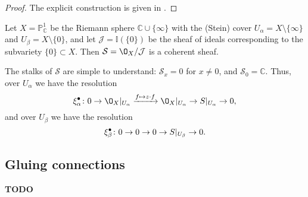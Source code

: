         \begin{proof}
            The explicit construction is given in \cite[§1]{Green:1980wpa}.
        \end{proof}

        \begin{example}
            Let $X=\mathbb{P}^1_\mathbb{C}$ be the Riemann sphere $\mathbb{C}\cup\{\infty\}$ with the (Stein) cover $U_\alpha=X\setminus\{\infty\}$ and $U_\beta=X\setminus\{0\}$, and let $\mathcal{J}=\mathbb{I}(\{0\})$ be the sheaf of ideals corresponding to the subvariety $\{0\}\subset X$.
            Then $\mathcal{S}=\O_X/\mathcal{J}$ is a coherent sheaf.

            The stalks of $\mathcal{S}$ are simple to understand: $\mathcal{S}_x=0$ for $x\neq0$, and $\mathcal{S}_0=\mathbb{C}$.
            Thus, over $U_\alpha$ we have the resolution
            \begin{equation*}
                \xi_\alpha^\bullet\colon 0\to\O_X\vert_{U_\alpha}\xrightarrow{f\mapsto z\cdot f}\O_X\vert_{U_\alpha}\to S\vert_{U_\alpha}\to0,
            \end{equation*}
            and over $U_\beta$ we have the resolution
            \begin{equation*}
                \xi_\beta^\bullet\colon 0\to0\to0\to S\vert_{U_\beta}\to0.\qedhere
            \end{equation*}
        \end{example}


    \subsection{Gluing connections} %
    \label{sub:gluing_connections}

    {\color{red}\textbf{TODO}}
    

